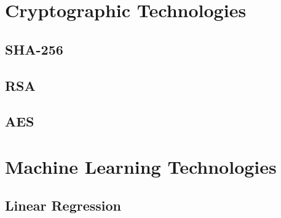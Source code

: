 \begin{appendices}
\chapter{Cryptographic Technologies}
\section{SHA-256}
\label{app:1}

\section{RSA}
\label{app:2}

\section{AES}
\label{app:3}

\chapter{Machine Learning Technologies}
\section{Linear Regression}
\label{app:4}

\end{appendices}
